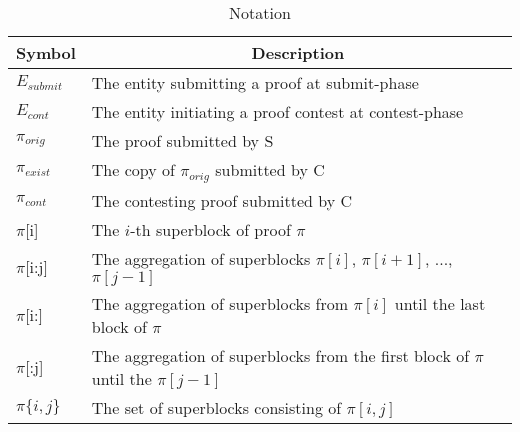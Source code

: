 \begin{table}[H]
\begin{tabular}{ll}
\hline
\multicolumn{1}{|c|}{Symbol} & \multicolumn{1}{c|}{Description}                       \\ \hline
$E_{submit}$                   & The entity submitting a proof at submit-phase          \\
$E_{cont}$                     & The entity initiating a proof contest at contest-phase \\
$\pi_{orig}$                 & The proof submitted by S                               \\
$\pi_{exist}$                & The copy of $\pi_{orig}$ submitted by C                \\
$\pi_{cont}$                 & The contesting proof submitted by C                    \\
$\pi${[}i{]}                 & The $i$-th superblock of proof $\pi$                  \\
$\pi${[}i:j{]} & The aggregation of superblocks $\pi[i]$, $\pi[i+1]$, ..., $\pi[j-1]$              \\
$\pi${[}i:{]}  & The aggregation of superblocks from $\pi[i]$ until the last block of $\pi$        \\
$\pi${[}:j{]}  & The aggregation of superblocks from the first block of $\pi$ until the $\pi[j-1]$ \\
$\pi\{i, j\}$                & The set of superblocks consisting of $\pi[i,j]$
\end{tabular}
\caption{Notation}
\label{table:notation}
\end{table}
